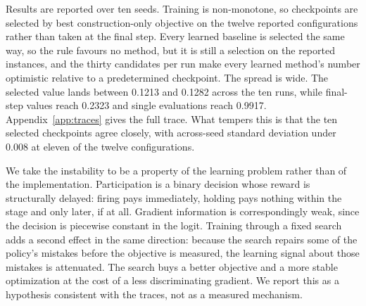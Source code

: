 Results are reported over ten seeds. Training is non-monotone, so checkpoints
are selected by best construction-only objective on the twelve reported
configurations rather than taken at the final step. Every learned baseline is
selected the same way, so the rule favours no method, but it is still a
selection on the reported instances, and the thirty candidates per run make
every learned method's number optimistic relative to a predetermined
checkpoint. The spread is wide. The selected value lands between 0.1213 and
0.1282 across the ten runs, while final-step values reach 0.2323 and single
evaluations reach 0.9917. Appendix~\ref{app:traces} gives the full trace. What
tempers this is that the ten selected checkpoints agree closely, with
across-seed standard deviation under 0.008 at eleven of the twelve
configurations.

We take the instability to be a property of the learning problem rather than
of the implementation. Participation is a binary decision whose reward is
structurally delayed: firing pays immediately, holding pays nothing within the
stage and only later, if at all. Gradient information is correspondingly weak,
since the decision is piecewise constant in the logit. Training through a
fixed search adds a second effect in the same direction: because the search
repairs some of the policy's mistakes before the objective is measured, the
learning signal about those mistakes is attenuated. The search buys a better
objective and a more stable optimization at the cost of a less discriminating
gradient. We report this as a hypothesis consistent with the traces, not as a
measured mechanism.
